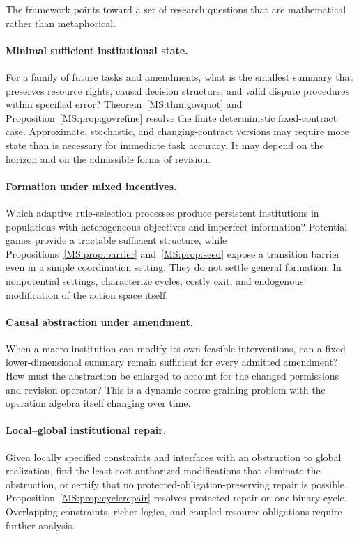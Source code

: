 The framework points toward a set of research questions that are mathematical rather than metaphorical.

\paragraph{Minimal sufficient institutional state.}
For a family of future tasks and amendments, what is the smallest summary that preserves resource rights, causal decision structure, and valid dispute procedures within specified error? Theorem~\ref{MS:thm:govquot} and Proposition~\ref{MS:prop:govrefine} resolve the finite deterministic fixed-contract case. Approximate, stochastic, and changing-contract versions may require more state than is necessary for immediate task accuracy. It may depend on the horizon and on the admissible forms of revision.

\paragraph{Formation under mixed incentives.}
Which adaptive rule-selection processes produce persistent institutions in populations with heterogeneous objectives and imperfect information? Potential games provide a tractable sufficient structure, while Propositions~\ref{MS:prop:barrier} and~\ref{MS:prop:seed} expose a transition barrier even in a simple coordination setting. They do not settle general formation. In nonpotential settings, characterize cycles, costly exit, and endogenous modification of the action space itself.

\paragraph{Causal abstraction under amendment.}
When a macro-institution can modify its own feasible interventions, can a fixed lower-dimensional summary remain sufficient for every admitted amendment? How must the abstraction be enlarged to account for the changed permissions and revision operator? This is a dynamic coarse-graining problem with the operation algebra itself changing over time.

\paragraph{Local--global institutional repair.}
Given locally specified constraints and interfaces with an obstruction to global realization, find the least-cost authorized modifications that eliminate the obstruction, or certify that no protected-obligation-preserving repair is possible. Proposition~\ref{MS:prop:cyclerepair} resolves protected repair on one binary cycle. Overlapping constraints, richer logics, and coupled resource obligations require further analysis.

